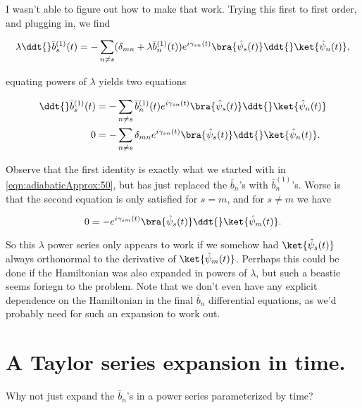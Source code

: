 I wasn't able to figure out how to make that work.  Trying this first to first order, and plugging in, we find

\begin{equation}\label{eqn:adiabaticApprox:170}
\lambda \ddt{} \bar{b}^{(1)}_s(t) = - \sum_{n \ne s} ( \delta_{mn} + \lambda \bar{b}^{(1)}_n(t) ) 
e^{i \gamma_{sn}(t) } \bra{\hat{\psi}_s(t)} \ddt{} \ket{\hat{\psi}_n(t)},
\end{equation}

equating powers of $\lambda$ yields two equations

\begin{align}\label{eqn:adiabaticApprox:190}
\ddt{} \bar{b}_s^{(1)}(t) &= - \sum_{n \ne s} \bar{b}^{(1)}_n(t) e^{i \gamma_{sn}(t) } \bra{\hat{\psi}_s(t)} \ddt{} \ket{\hat{\psi}_n(t)} \\
0 &= - \sum_{n \ne s} \delta_{mn} e^{i \gamma_{sn}(t) } \bra{\hat{\psi}_s(t)} \ddt{} \ket{\hat{\psi}_n(t)}.
\end{align}

Observe that the first identity is exactly what we started with in \ref{eqn:adiabaticApprox:50}, but has just replaced the $\bar{b}_n$'s with $\bar{b}^{(1)}_n$'s.  Worse is that the second equation is only satisfied for $s = m$, and for $s \ne m$ we have

\begin{equation}\label{eqn:adiabaticApprox:n}
0 = - e^{i \gamma_{sm}(t) } \bra{\hat{\psi}_s(t)} \ddt{} \ket{\hat{\psi}_m(t)}.
\end{equation}

So this $\lambda$ power series only appears to work if we somehow had $\ket{\hat{\psi}_s(t)}$ always orthonormal to the derivative of $\ket{\hat{\psi}_m(t)}$.  Perrhaps this could be done if the Hamiltonian was also expanded in powers of $\lambda$, but such a beastie seems foriegn to the problem.  Note that we don't even have any explicit dependence on the Hamiltonian in the final $\bar{b}_n$ differential equations, as we'd probably need for such an expansion to work out.

\section{A Taylor series expansion in time.}

Why not just expand the $\bar{b}_n$'s in a power series parameterized by time?

\EndNoBibArticle
